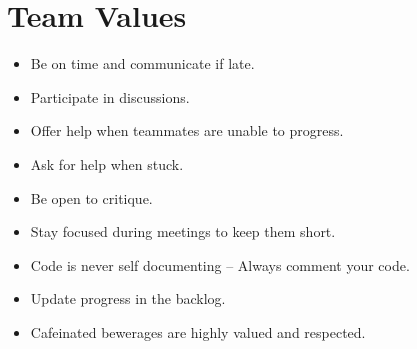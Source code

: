 \section{Team Values}
\begin{itemize}
  \item Be on time and communicate if late.
  \item Participate in discussions.
  \item Offer help when teammates are unable to progress.
  \item Ask for help when stuck.
  \item Be open to critique.
  \item Stay focused during meetings to keep them short.
  \item Code is never self documenting -- Always comment your code.
  \item Update progress in the backlog.
  \item Cafeinated bewerages are highly valued and respected.
\end{itemize}